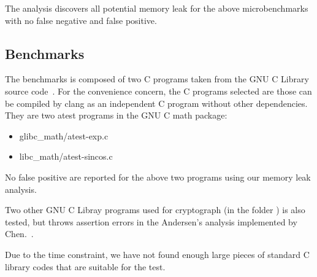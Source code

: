 The analysis discovers all potential memory leak for the above microbenchmarks 
with no false negative and false positive.


\subsection{Benchmarks}
\label{benchmarks}

The benchmarks is composed of two C programs taken from the GNU C Library 
source code~\cite{glibc}. For the convenience concern, the C programs selected 
are those can be compiled by clang as an independent C program without other
dependencies. They are two atest programs in the GNU C math package:

\begin{itemize}
  \item glibc\_math/atest-exp.c
  \item libc\_math/atest-sincos.c
\end{itemize}

No false positive are reported for the above two programs using our memory leak 
analysis.

Two other GNU C Libray programs used for cryptograph (in the folder \crypt) 
is also tested, but throws assertion errors in the Andersen's 
analysis implemented by Chen.~\cite{chen}.

Due to the time constraint, we have not found enough large pieces of standard C 
library codes that are suitable for the test.
